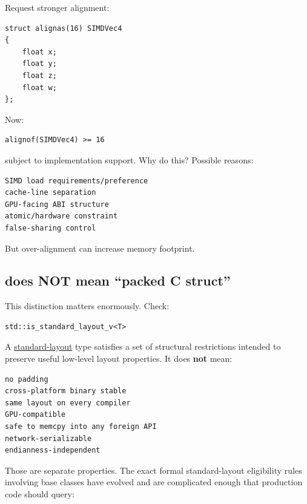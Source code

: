 Request stronger alignment:

\begin{verbatim}
struct alignas(16) SIMDVec4
{
    float x;
    float y;
    float z;
    float w;
};
\end{verbatim}

Now:

\begin{verbatim}
alignof(SIMDVec4) >= 16
\end{verbatim}

subject to implementation support. Why do this? Possible reasons:

\begin{verbatim}
SIMD load requirements/preference
cache-line separation
GPU-facing ABI structure
atomic/hardware constraint
false-sharing control
\end{verbatim}

But over-alignment can increase memory footprint.

\subsection{\texorpdfstring{ does NOT mean ``packed C struct''}{ does NOT mean ``packed C struct''}}\label{01-foundations-i-ch003-standard-layout-does-not-mean-packed-c-struct}

\hypertarget{01-foundations-i-ch003-standard-layout-does-not-mean-packed-c-struct}{}

This distinction matters enormously. Check:

\begin{verbatim}
std::is_standard_layout_v<T>
\end{verbatim}

A \hyperref[appendix-958870a64c53]{standard-layout} type satisfies a set of structural restrictions intended to preserve useful low-level layout properties. It does \textbf{not} mean:

\begin{verbatim}
no padding
cross-platform binary stable
same layout on every compiler
GPU-compatible
safe to memcpy into any foreign API
network-serializable
endianness-independent
\end{verbatim}

Those are separate properties. The exact formal standard-layout eligibility rules involving base classes have evolved and are complicated enough that production code should query:

